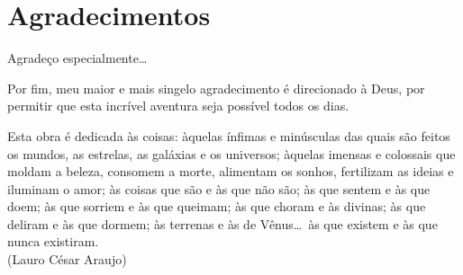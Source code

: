 \documentclass[a4paper]{abnt}
\begin{document}
\chapter*{Agradecimentos}

Agradeço especialmente\ldots

Por fim, meu maior e mais singelo agradecimento é direcionado à Deus, por
permitir que esta incrível aventura seja possível todos os dias.

\mbox{}
\newpage


%
%


\capa


\newpage
{}

\begin{flushright}

\begin{minipage}[b]{8.9cm}
\vspace{17.01cm}
Esta obra é dedicada às coisas: àquelas ínfimas e minúsculas das quais são
feitos os mundos, as estrelas, as galáxias e os universos; àquelas imensas e
colossais que moldam a beleza, consomem a morte, alimentam os sonhos,
fertilizam as ideias e iluminam o amor; às coisas que são e às que não são; às
que sentem e às que doem; às que sorriem e às que queimam; às que choram e às
divinas; às que deliram e às que dormem; às terrenas e às de Vênus\ldots~às que
existem e às que nunca existiram.\\
(Lauro César Araujo)
\end{minipage}

\end{flushright}
\end{document}
